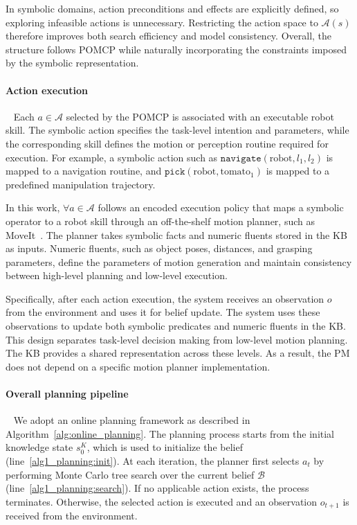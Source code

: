 In symbolic domains, action preconditions and effects are explicitly defined, so exploring infeasible actions is unnecessary. Restricting the action space to $\mathcal{A}(s)$ therefore improves both search efficiency and model consistency. Overall, the structure follows POMCP while naturally incorporating the constraints imposed by the symbolic representation.

\paragraph{Action execution}~\label{method:action_execution}
Each $a \in \mathcal{A}$ selected by the POMCP is associated with an executable robot skill. The symbolic action specifies the task-level intention and parameters, while the corresponding skill defines the motion or perception routine required for execution. For example, a symbolic action such as $\texttt{navigate}(\text{robot}, l_1, l_2)$ is mapped to a navigation routine, and $\texttt{pick}(\text{robot}, \text{tomato}_1)$ is mapped to a predefined manipulation trajectory.

In this work, $\forall a \in \mathcal{A}$ follows an encoded execution policy that maps a symbolic operator to a robot skill through an off-the-shelf motion planner, such as MoveIt~\cite{chitta2012moveit}. The planner takes symbolic facts and numeric fluents stored in the KB as inputs. Numeric fluents, such as object poses, distances, and grasping parameters, define the parameters of motion generation and maintain consistency between high-level planning and low-level execution.

Specifically, after each action execution, the system receives an observation $o$ from the environment and uses it for belief update. The system uses these observations to update both symbolic predicates and numeric fluents in the KB. This design separates task-level decision making from low-level motion planning. The KB provides a shared representation across these levels. As a result, the PM does not depend on a specific motion planner implementation.



\paragraph{Overall planning pipeline}~\label{method:planning}
We adopt an online planning framework as described in Algorithm~\ref{alg:online_planning}. The planning process starts from the initial knowledge state $s^{K}_{0}$, which is used to initialize the belief (line~\ref{alg1_planning:init}). At each iteration, the planner first selects $a_t$ by performing Monte Carlo tree search over the current belief $\mathcal{B}$ (line~\ref{alg1_planning:search}). If no applicable action exists, the process terminates. Otherwise, the selected action is executed and an observation $o_{t+1}$ is received from the environment.

